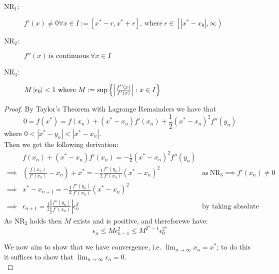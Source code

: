 \begin{Uniform Convergence Thm}
\begin{Quad Convergence of Newton}
\begin{description}
\item[\(\textrm{NR}_1\):]
\begin{math}
	f'(x) \neq 0 \forall x \in I := [x^\ast - r, x^\ast + r], \ \mathrm{where}\ r \in \left[\left|x^\ast - x_0\right|, \infty\right)
\end{math}

\item[\(\textrm{NR}_2\):]
\begin{math}
	f''(x) \ \textrm{is continuous}\  \forall x \in I
\end{math}

\item[\(\textrm{NR}_3\):]
\begin{math}
	M\left|\epsilon_0\right| < 1 \ \mathrm{where}\ M := \sup\left\{\left|\frac{f''(x)}{f'(x)}\right| : x \in I\right\}\\
\end{math}
\end{description}
\end{Quad Convergence of Newton}

\begin{proof}
By Taylor's Theorem with Lagrange Remainders we have that
\begin{displaymath}
	0 = f(x^\ast) = f(x_n) + (x^\ast - x_n)f'(x_n) + \frac{1}{2}
		(x^\ast - x_n)^2f''(y_n)
\end{displaymath}
where \(0 < |x^\ast - y_n| < |x^\ast - x_n|\).\\

Then we get the following derivation:
\begin{displaymath}
\begin{align*}
	&f(x_n) + (x^\ast - x_n)f'(x_n) = 
		-\frac{1}{2}(x^\ast - x_n)^2f''(y_n)\\
	\implies &(\frac{f(x_n)}{f'(x_n)} - x_n) + x^\ast =
		-\frac{1}{2}\frac{f''(y_n)}{f'(x_n)}(x^\ast - x_n)^2
		&\textrm{as} \ \textrm{NR}_3 \implies f'(x_n) \neq 0\\
	\implies &x^\ast - x_{n+1} = 
		-\frac{1}{2}\frac{f''(y_n)}{f'(x_n)}(x^\ast - x_n)^2\\
	\implies &\epsilon_{n+1} =
		\frac{1}{2}\left|\frac{f''(y_n)}{f'(x_n)}\right|\epsilon_n^2
		&\textrm{by taking absolute values}
\end{align*}
\end{displaymath}
As \(\textrm{NR}_2\) holds then \(M\) exists and is positive, and thereforewe have:
\[\epsilon_n \le M\epsilon_{n-1}^2 \le M^{2^n - 1}\epsilon_0^{2^n}\]

We now aim to show that we have convergence, i.e. \(\lim_{n \to \infty} x_n = x^\ast\); to do this it suffices to show that \(\lim_{n\to\infty}\epsilon_n = 0\).\\


\end{proof}
\end{Uniform Convergence Thm}
